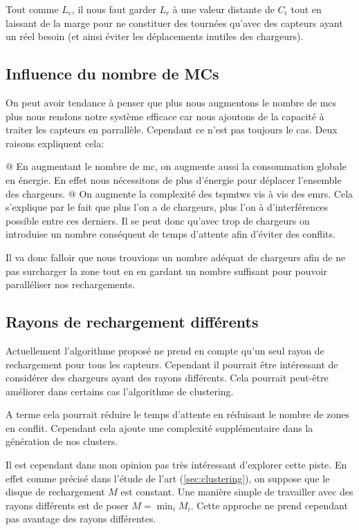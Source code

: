 \documentclass[final]{polytech/polytech}
\begin{document}
			Tout comme $L_c$, il nous faut garder $L_r$ à une valeur distante de $C_i$ tout en laissant de la marge pour ne constituer des tournées qu'avec des capteurs ayant un réel besoin (et ainsi éviter les déplacements inutiles des chargeurs).
		
		\subsection{Influence du nombre de MCs}
			On peut avoir tendance à penser que plus nous augmentons le nombre de \glspl{mc} plus nous rendons notre système efficace car nous ajoutons de la capacité à traiter les capteurs en parrallèle.
			Cependant ce n'est pas toujours le cas.
			Deux raisons expliquent cela:
			\begin{easylist}
				@ En augmentant le nombre de \gls{mc}, on augmente aussi la consommation globale en énergie.
				En effet nous nécessitons de plus d'énergie pour déplacer l'ensemble des chargeurs.
				@ On augmente la complexité des \glspl{tspmtw} vis à vis des \glspl{emr}.
				Cela s'explique par le fait que plus l'on a de chargeurs, plus l'on à d'interférences possible entre ces derniers.
				Il se peut donc qu'avec trop de chargeurs on introduise un nombre conséquent de temps d'attente afin d'éviter des conflits.
			\end{easylist}
			
			Il va donc falloir que nous trouvions un nombre adéquat de chargeurs afin de ne pas surcharger la zone tout en en gardant un nombre suffisant pour pouvoir paralléliser nos rechargements.
		
		\subsection{Rayons de rechargement différents}
			Actuellement l'algorithme proposé ne prend en compte qu'un seul rayon de rechargement pour tous les capteurs.
			Cependant il pourrait être intéressant de considérer des chargeurs ayant des rayons différents.
			Cela pourrait peut-être améliorer dans certains cas l'algorithme de clustering.
			
			A terme cela pourrait réduire le temps d'attente en réduisant le nombre de zones en conflit.
			Cependant cela ajoute une complexité supplémentaire dans la génération de nos clusters.
			
			Il est cependant dans mon opinion pas très intéressant d'explorer cette piste.
			En effet comme précisé dans l'étude de l'art (\autoref{sec:clustering}), on suppose que le disque de rechargement $M$ est constant.
			Une manière simple de travailler avec des rayons différents est de poser $M=\min_{i}M_i$.
			Cette approche ne prend cependant pas avantage des rayons différentes.
			
\end{document}
